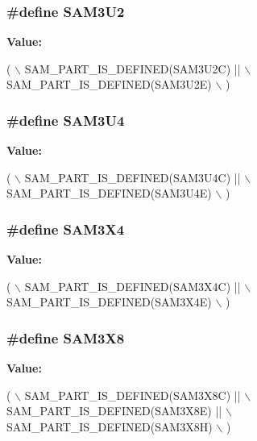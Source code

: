 \subsubsection[{S\+A\+M3\+U2}]{\setlength{\rightskip}{0pt plus 5cm}\#define S\+A\+M3\+U2}\label{group__sam__part__macros__group_ga0feb884f39921517436f269c86914cb0}
{\bfseries Value\+:}
\begin{DoxyCode}
( \(\backslash\)
        SAM\_PART\_IS\_DEFINED(SAM3U2C) || \(\backslash\)
        SAM\_PART\_IS\_DEFINED(SAM3U2E) \(\backslash\)
        )
\end{DoxyCode}
\hypertarget{group__sam__part__macros__group_ga2af1cda107cbae1f393bce7a6c659a98}{}
\subsubsection[{S\+A\+M3\+U4}]{\setlength{\rightskip}{0pt plus 5cm}\#define S\+A\+M3\+U4}\label{group__sam__part__macros__group_ga2af1cda107cbae1f393bce7a6c659a98}
{\bfseries Value\+:}
\begin{DoxyCode}
( \(\backslash\)
        SAM\_PART\_IS\_DEFINED(SAM3U4C) || \(\backslash\)
        SAM\_PART\_IS\_DEFINED(SAM3U4E) \(\backslash\)
        )
\end{DoxyCode}
\hypertarget{group__sam__part__macros__group_ga735357bdbbd05356a7829e517fb4203f}{}
\subsubsection[{S\+A\+M3\+X4}]{\setlength{\rightskip}{0pt plus 5cm}\#define S\+A\+M3\+X4}\label{group__sam__part__macros__group_ga735357bdbbd05356a7829e517fb4203f}
{\bfseries Value\+:}
\begin{DoxyCode}
( \(\backslash\)
        SAM\_PART\_IS\_DEFINED(SAM3X4C) || \(\backslash\)
        SAM\_PART\_IS\_DEFINED(SAM3X4E) \(\backslash\)
        )
\end{DoxyCode}
\hypertarget{group__sam__part__macros__group_ga13be8353e38999aaca5c412c895c15da}{}
\subsubsection[{S\+A\+M3\+X8}]{\setlength{\rightskip}{0pt plus 5cm}\#define S\+A\+M3\+X8}\label{group__sam__part__macros__group_ga13be8353e38999aaca5c412c895c15da}
{\bfseries Value\+:}
\begin{DoxyCode}
( \(\backslash\)
        SAM\_PART\_IS\_DEFINED(SAM3X8C) || \(\backslash\)
        SAM\_PART\_IS\_DEFINED(SAM3X8E) || \(\backslash\)
        SAM\_PART\_IS\_DEFINED(SAM3X8H) \(\backslash\)
        )
\end{DoxyCode}
\hypertarget{group__sam__part__macros__group_gaae4990dfaa4eeed17d8a0351cca02fdd}{}
